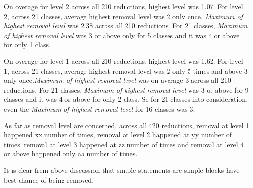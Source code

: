On overage for level 2 across all 210 reductions, highest level was 1.07. For level 2, across 21 classes, average highest removal level was 2 only once. \emph{Maximum of highest removal level}  was 2.38 across all 210 reductions. For 21 classes, \emph{Maximum of highest removal level}  was 3 or above only for 5 classes and it was 4 or above for only 1 class.

On overage for level 1 across all 210 reductions, highest level was 1.62. For level 1, across 21 classes, average highest removal level was 2 only 5 times and above 3 only once.\emph{Maximum of highest removal level}   was on average 3 across all 210 reductions. For 21 classes, \emph{Maximum of highest removal level} was 3 or above for 9 classes and it was 4 or above for only 2 class. So for 21 classes into consideration, even the \emph{Maximum of highest removal level} for 16 classes was 3. 

As far as removal level are concerned. across all 420 reductions, removal at level 1 happened xx number of times, removal at level 2 happened at yy number of times, removal at level 3 happened at zz number of times and removal at level 4 or above happened only aa number of times. 

It is clear from above discussion that simple statements are simple blocks have best chance of being removed. 

   
   

